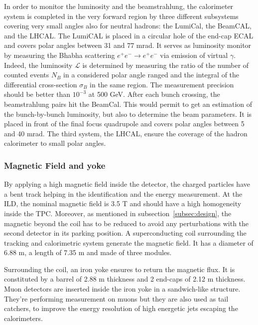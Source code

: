       In order to monitor the luminosity and the beamstrahlung, the calorimeter system is completed in the very forward region by three different subsystems covering very small angles also for neutral hadrons: the LumiCal, the BeamCAL, and the \gls{LHCAL}.
      The LumiCAL is placed in a circular hole of the end-cap \gls{ECAL} and covers polar angles between 31 and 77 mrad. 
      It serves as luminosity monitor by measuring the Bhabha scattering $e^+e^- \rightarrow e^+e^-$ via emission of virtual $\gamma$.
      Indeed, the luminosity $\mathcal{L}$ is determined by measuring  the ratio of the number of counted events $N_B$ in a considered polar angle ranged and the integral of the differential cross-section $\sigma_B$ in the same region.
      The measurement precision should be better than $10^{-3}$ at 500 GeV.
      After each bunch crossing, the beamstrahlung pairs hit the BeamCal.
      This would permit to get an estimation of the bunch-by-bunch luminosity, but also to determine the beam parameters.
      It is placed in front of the final focus quadrupole and covers polar angles between 5 and 40 mrad.
      The third system, the \gls{LHCAL}, ensure the coverage of the hadron calorimeter to small polar angles.

      \subsubsection{Magnetic Field and yoke}

     By applying a high magnetic field inside the detector, the charged particles have a bent track helping in the identification and the energy measurement.
     At the \gls{ILD}, the nominal magnetic field is 3.5 T and should have a high homogeneity inside the TPC.
     Moreover, as mentioned in subsection~\ref{subsec:design}, the magnetic beyond the coil has to be reduced to avoid any perturbations with the second detector in its parking position.
     A superconducting coil surrounding the tracking and calorimetric system generate the magnetic field.
     It has a diameter of 6.88 m, a length of 7.35 m and made of three modules.

     Surrounding the coil, an iron yoke ensures to return the magnetic flux. 
     It is constituted by a barrel of 2.88 m thickness and 2 end-caps of 2.12 m thickness.
     Muon detectors are inserted inside the iron yoke in a sandwich-like structure.
     They're performing measurement on muons but they are also used as tail catchers, to improve the energy resolution of high energetic jets escaping the calorimeters. 


